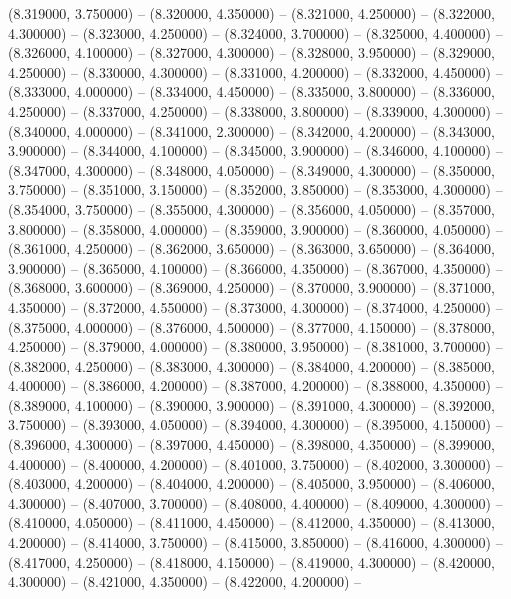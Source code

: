 (8.319000, 3.750000) -- 
(8.320000, 4.350000) -- 
(8.321000, 4.250000) -- 
(8.322000, 4.300000) -- 
(8.323000, 4.250000) -- 
(8.324000, 3.700000) -- 
(8.325000, 4.400000) -- 
(8.326000, 4.100000) -- 
(8.327000, 4.300000) -- 
(8.328000, 3.950000) -- 
(8.329000, 4.250000) -- 
(8.330000, 4.300000) -- 
(8.331000, 4.200000) -- 
(8.332000, 4.450000) -- 
(8.333000, 4.000000) -- 
(8.334000, 4.450000) -- 
(8.335000, 3.800000) -- 
(8.336000, 4.250000) -- 
(8.337000, 4.250000) -- 
(8.338000, 3.800000) -- 
(8.339000, 4.300000) -- 
(8.340000, 4.000000) -- 
(8.341000, 2.300000) -- 
(8.342000, 4.200000) -- 
(8.343000, 3.900000) -- 
(8.344000, 4.100000) -- 
(8.345000, 3.900000) -- 
(8.346000, 4.100000) -- 
(8.347000, 4.300000) -- 
(8.348000, 4.050000) -- 
(8.349000, 4.300000) -- 
(8.350000, 3.750000) -- 
(8.351000, 3.150000) -- 
(8.352000, 3.850000) -- 
(8.353000, 4.300000) -- 
(8.354000, 3.750000) -- 
(8.355000, 4.300000) -- 
(8.356000, 4.050000) -- 
(8.357000, 3.800000) -- 
(8.358000, 4.000000) -- 
(8.359000, 3.900000) -- 
(8.360000, 4.050000) -- 
(8.361000, 4.250000) -- 
(8.362000, 3.650000) -- 
(8.363000, 3.650000) -- 
(8.364000, 3.900000) -- 
(8.365000, 4.100000) -- 
(8.366000, 4.350000) -- 
(8.367000, 4.350000) -- 
(8.368000, 3.600000) -- 
(8.369000, 4.250000) -- 
(8.370000, 3.900000) -- 
(8.371000, 4.350000) -- 
(8.372000, 4.550000) -- 
(8.373000, 4.300000) -- 
(8.374000, 4.250000) -- 
(8.375000, 4.000000) -- 
(8.376000, 4.500000) -- 
(8.377000, 4.150000) -- 
(8.378000, 4.250000) -- 
(8.379000, 4.000000) -- 
(8.380000, 3.950000) -- 
(8.381000, 3.700000) -- 
(8.382000, 4.250000) -- 
(8.383000, 4.300000) -- 
(8.384000, 4.200000) -- 
(8.385000, 4.400000) -- 
(8.386000, 4.200000) -- 
(8.387000, 4.200000) -- 
(8.388000, 4.350000) -- 
(8.389000, 4.100000) -- 
(8.390000, 3.900000) -- 
(8.391000, 4.300000) -- 
(8.392000, 3.750000) -- 
(8.393000, 4.050000) -- 
(8.394000, 4.300000) -- 
(8.395000, 4.150000) -- 
(8.396000, 4.300000) -- 
(8.397000, 4.450000) -- 
(8.398000, 4.350000) -- 
(8.399000, 4.400000) -- 
(8.400000, 4.200000) -- 
(8.401000, 3.750000) -- 
(8.402000, 3.300000) -- 
(8.403000, 4.200000) -- 
(8.404000, 4.200000) -- 
(8.405000, 3.950000) -- 
(8.406000, 4.300000) -- 
(8.407000, 3.700000) -- 
(8.408000, 4.400000) -- 
(8.409000, 4.300000) -- 
(8.410000, 4.050000) -- 
(8.411000, 4.450000) -- 
(8.412000, 4.350000) -- 
(8.413000, 4.200000) -- 
(8.414000, 3.750000) -- 
(8.415000, 3.850000) -- 
(8.416000, 4.300000) -- 
(8.417000, 4.250000) -- 
(8.418000, 4.150000) -- 
(8.419000, 4.300000) -- 
(8.420000, 4.300000) -- 
(8.421000, 4.350000) -- 
(8.422000, 4.200000) -- 
